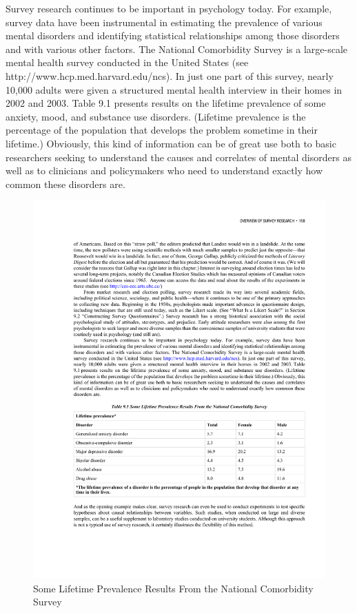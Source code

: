 Survey research continues to be important in psychology today. For example, survey data have been instrumental in estimating the prevalence of various mental disorders and identifying statistical relationships among those disorders and with various other factors. The National Comorbidity Survey is a large-scale mental health survey conducted in the United States (see http://www.hcp.med.harvard.edu/ncs). In just one part of this survey, nearly 10,000 adults were given a structured mental health interview in their homes in 2002 and 2003. Table 9.1 presents results on the lifetime prevalence of some anxiety, mood, and substance use disorders. (Lifetime prevalence is the percentage of the population that develops the problem sometime in their lifetime.) Obviously, this kind of information can be of great use both to basic researchers seeking to understand the causes and correlates of mental disorders as well as to clinicians and policymakers who need to understand exactly how common these disorders are.

\begin{figure}

\includegraphics[width=\linewidth]{figures/C9survey.pdf}

\caption{Some Lifetime Prevalence Results From the National Comorbidity Survey}

\label{fig:qualtable}

\end{figure}

